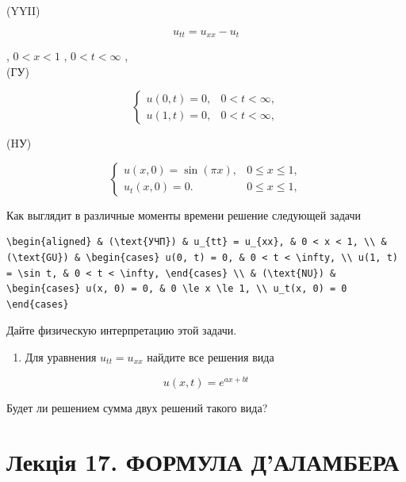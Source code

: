 \documentclass[
  ukrainian,
]{article}
\providecommand{\tightlist}{%
  \setlength{\itemsep}{0pt}\setlength{\parskip}{0pt}}
\begin{document}
(YYII)

\[
u_{tt} = u_{xx} - u_t
\]

, \(0 < x < 1\) , \(0 < t < \infty\) ,\\
(ГУ)

\[
\begin{cases} u(0, t) = 0, & 0 < t < \infty, \\ u(1, t) = 0, & 0 < t < \infty, \end{cases}
\]

(HУ)

\[
\begin{cases} u(x, 0) = \sin(\pi x), & 0 \le x \le 1, \\ u_t(x, 0) = 0. & 0 \le x \le 1, \end{cases}
\]

Как выглядит в различные моменты времени решение следующей задачи

\begin{verbatim}
\begin{aligned} & (\text{УЧП}) & u_{tt} = u_{xx}, & 0 < x < 1, \\ & (\text{GU}) & \begin{cases} u(0, t) = 0, & 0 < t < \infty, \\ u(1, t) = \sin t, & 0 < t < \infty, \end{cases} \\ & (\text{NU}) & \begin{cases} u(x, 0) = 0, & 0 \le x \le 1, \\ u_t(x, 0) = 0 \end{cases}
\end{verbatim}

Дайте физическую интерпретацию этой задачи.

\begin{enumerate}
\def\labelenumi{\arabic{enumi}.}
\setcounter{enumi}{3}
\tightlist
\item
  Для уравнения \(u_{tt} = u_{xx}\) найдите все решения вида
\end{enumerate}

\[
u(x, t) = e^{ax+bt}
\]

Будет ли решением сумма двух решений такого вида?

\section{Лекція 17. ФОРМУЛА
Д'АЛАМБЕРА}\label{ux43bux435ux43aux446ux456ux44f-17.-ux444ux43eux440ux43cux443ux43bux430-ux434ux430ux43bux430ux43cux431ux435ux440ux430}
\end{document}
